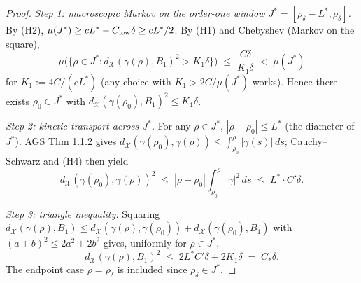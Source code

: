 \documentclass[11pt]{article}
\theoremstyle{definition}
\newcommand{\X}{\mathcal X}
\begin{document}
\begin{proof}
\emph{Step 1: macroscopic Markov on the order-one window
$J^*=[\rho_\delta-L^*,\rho_\delta]$.}
By (H2), $\mu(J^*)\ge cL^*-C_{\rm low}\delta\ge cL^*/2$. By
(H1) and Chebyshev (Markov on the square),
\[
   \mu\bigl(\{\rho\in J^*:d_\X(\gamma(\rho),B_1)^2>K_1\delta\}\bigr)
   \;\le\;\frac{C\delta}{K_1\delta}\;<\;\mu(J^*)
\]
for $K_1:=4C/(cL^*)$ (any choice with $K_1>2C/\mu(J^*)$ works). Hence
there exists $\rho_0\in J^*$ with
$d_\X(\gamma(\rho_0),B_1)^2\le K_1\delta$.

\emph{Step 2: kinetic transport across $J^*$.} For any $\rho\in J^*$,
$|\rho-\rho_0|\le L^*$ (the diameter of $J^*$). AGS Thm 1.1.2
\cite[Thm.~1.1.2]{AGS2008} gives
$d_\X(\gamma(\rho_0),\gamma(\rho))\le\int_{\rho_0}^{\rho}|\dot\gamma(s)|\,ds$;
Cauchy--Schwarz and (H4) then yield
\[
   d_\X(\gamma(\rho_0),\gamma(\rho))^2
   \;\le\;|\rho-\rho_0|\!\!\int_{\rho_0}^{\rho}|\dot\gamma|^2\,ds
   \;\le\;L^*\!\cdot C'\delta.
\]

\emph{Step 3: triangle inequality.} Squaring
$d_\X(\gamma(\rho),B_1)\le d_\X(\gamma(\rho),\gamma(\rho_0))+d_\X(\gamma(\rho_0),B_1)$
with $(a+b)^2\le 2a^2+2b^2$ gives, uniformly for $\rho\in J^*$,
\[
   d_\X(\gamma(\rho),B_1)^2\;\le\;2L^*C'\delta+2K_1\delta\;=\;C_*\delta.
\]
The endpoint case $\rho=\rho_\delta$ is included since $\rho_\delta\in J^*$.
\end{proof}
\end{document}
